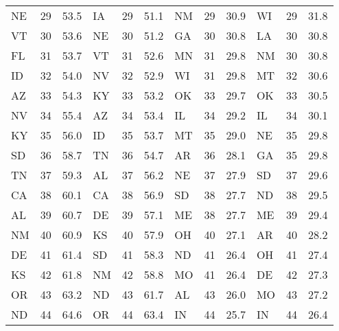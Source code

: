 \begin{longtable}{lrr|lrr||lrr|lrr}
        NE &   29 &   53.5 &            IA &   29 &  51.1 &             NM &   29 &   30.9 &            WI &   29 &   31.8 \\
        VT &   30 &   53.6 &            NE &   30 &  51.2 &             GA &   30 &   30.8 &            LA &   30 &   30.8 \\
        FL &   31 &   53.7 &            VT &   31 &  52.6 &             MN &   31 &   29.8 &            NM &   30 &   30.8 \\
        ID &   32 &   54.0 &            NV &   32 &  52.9 &             WI &   31 &   29.8 &            MT &   32 &   30.6 \\
        AZ &   33 &   54.3 &            KY &   33 &  53.2 &             OK &   33 &   29.7 &            OK &   33 &   30.5 \\
        NV &   34 &   55.4 &            AZ &   34 &  53.4 &             IL &   34 &   29.2 &            IL &   34 &   30.1 \\
        KY &   35 &   56.0 &            ID &   35 &  53.7 &             MT &   35 &   29.0 &            NE &   35 &   29.8 \\
        SD &   36 &   58.7 &            TN &   36 &  54.7 &             AR &   36 &   28.1 &            GA &   35 &   29.8 \\
        TN &   37 &   59.3 &            AL &   37 &  56.2 &             NE &   37 &   27.9 &            SD &   37 &   29.6 \\
        CA &   38 &   60.1 &            CA &   38 &  56.9 &             SD &   38 &   27.7 &            ND &   38 &   29.5 \\
        AL &   39 &   60.7 &            DE &   39 &  57.1 &             ME &   38 &   27.7 &            ME &   39 &   29.4 \\
        NM &   40 &   60.9 &            KS &   40 &  57.9 &             OH &   40 &   27.1 &            AR &   40 &   28.2 \\
        DE &   41 &   61.4 &            SD &   41 &  58.3 &             ND &   41 &   26.4 &            OH &   41 &   27.4 \\
        KS &   42 &   61.8 &            NM &   42 &  58.8 &             MO &   41 &   26.4 &            DE &   42 &   27.3 \\
        OR &   43 &   63.2 &            ND &   43 &  61.7 &             AL &   43 &   26.0 &            MO &   43 &   27.2 \\
        ND &   44 &   64.6 &            OR &   44 &  63.4 &             IN &   44 &   25.7 &            IN &   44 &   26.4 \\

\end{longtable}
